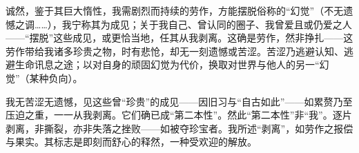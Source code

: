 诚然，鉴于其巨大惰性，我需剧烈而持续的劳作，方能摆脱俗称的“幻觉”（不无遗憾之调……），我宁称其为成见；关于我自己、曾认同的圈子、我曾爱且或仍爱之人——“摆脱”这些成见，或更恰当地，任其从我剥离。这确是劳作，然非挣扎——这劳作带给我诸多珍贵之物，时有悲怆，却无一刻遗憾或苦涩。苦涩乃逃避认知、逃避生命讯息之途；以对自身的顽固幻觉为代价，换取对世界与他人的另一“幻觉”（某种负向）。

我无苦涩无遗憾，见这些曾“珍贵”的成见——因旧习与“自古如此”——如累赘乃至压迫之重，一一从我剥离。它们确已成“第二本性”。然此“第二本性”非“我”。逐片剥离，非撕裂，亦非失落之挫败——如被夺珍宝者。我所述“剥离”，如劳作之报偿与果实。其标志是即刻而舒心的释然，一种受欢迎的解放。